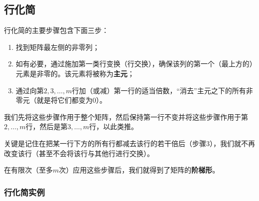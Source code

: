 \subsection{行化简}

行化简的主要步骤包含下面三步：
\begin{enumerate}
  \item 找到矩阵最左侧的非零列；
  \item 如有必要，通过施加第一类行变换（行交换），确保该列的第一个（最上方的）元素是非零的。该元素将被称为{\bf 主元}；
  \item 通过向第$2,3,\dots,m$行加（或减）第一行的适当倍数，“消去”主元之下的所有非零元（就是将它们都变为$0$）。
\end{enumerate}
我们先将这些步骤作用于整个矩阵，然后保持第一行不变并将这些步骤作用于第$2,\dots,m$行，然后是第$3,\dots,m$行，以此类推。

关键是记住在把某一行下方的所有行都减去该行的若干倍后（步骤3），我们就不再改变该行（甚至不会将该行与其他行进行交换）。

在有限次（至多$m$次）应用这些步骤后，我们就得到了矩阵的{\bf 阶梯形}。

\subsubsection{行化简实例}

